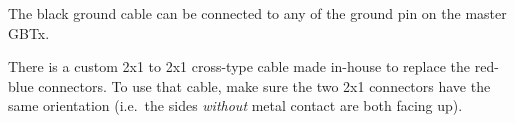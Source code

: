\begin{leftbar}
    The black ground cable can be connected to any of the ground pin on the
    master GBTx.
\end{leftbar}

\begin{leftbar}
    There is a custom 2x1 to 2x1 cross-type cable made in-house to replace the
    red-blue connectors.
    To use that cable, make sure the two 2x1 connectors have the same
    orientation (i.e.\ the sides \emph{without} metal contact are both facing
    up).
\end{leftbar}
